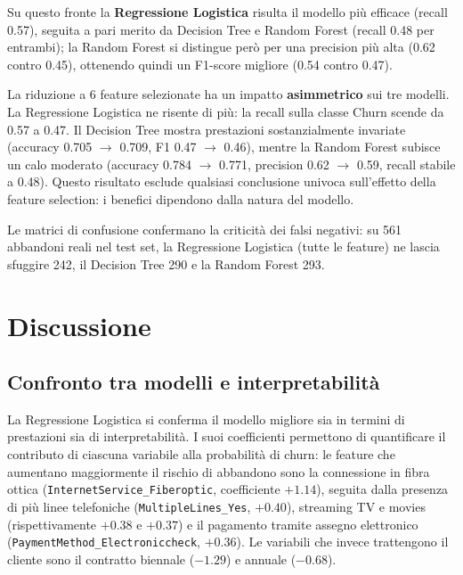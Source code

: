 \documentclass[11pt]{article}
\begin{document}
Su questo fronte la \textbf{Regressione Logistica} risulta il modello più
efficace (recall 0.57), seguita a pari merito da Decision Tree e Random Forest (recall 0.48 per entrambi); la Random Forest si distingue però per una precision più alta (0.62 contro 0.45), ottenendo quindi un F1-score migliore (0.54 contro 0.47).

La riduzione a 6 feature selezionate ha un impatto \textbf{asimmetrico} sui tre modelli. La Regressione Logistica ne risente di più: la recall sulla classe Churn scende da 0.57 a 0.47. Il Decision Tree mostra prestazioni sostanzialmente invariate (accuracy 0.705 $\rightarrow$ 0.709, F1 0.47 $\rightarrow$ 0.46), mentre la Random Forest subisce un calo moderato (accuracy 0.784 $\rightarrow$ 0.771, precision 0.62 $\rightarrow$ 0.59, recall stabile a 0.48). Questo risultato esclude qualsiasi conclusione univoca sull'effetto della feature selection: i benefici dipendono dalla natura del modello.

Le matrici di confusione confermano la criticità dei falsi negativi: su 561
abbandoni reali nel test set, la Regressione Logistica (tutte le feature) ne lascia sfuggire 242, il Decision Tree 290 e la Random Forest 293.
\section{Discussione}
\label{sec:discussione}

\subsection{Confronto tra modelli e interpretabilità}

La Regressione Logistica si conferma il modello migliore sia in termini di prestazioni sia di interpretabilità. I suoi coefficienti permettono di quantificare il contributo di ciascuna variabile alla probabilità di churn: le feature che aumentano maggiormente il rischio di abbandono sono la connessione in fibra ottica (\texttt{InternetService\_Fiberoptic}, coefficiente $+1.14$), seguita dalla presenza di più linee telefoniche (\texttt{MultipleLines\_Yes}, $+0.40$), streaming TV e movies (rispettivamente $+0.38$ e $+0.37$) e il pagamento tramite assegno elettronico (\texttt{PaymentMethod\_Electroniccheck}, $+0.36$). Le variabili che invece trattengono il cliente sono il contratto biennale ($-1.29$) e annuale ($-0.68$).
\end{document}
